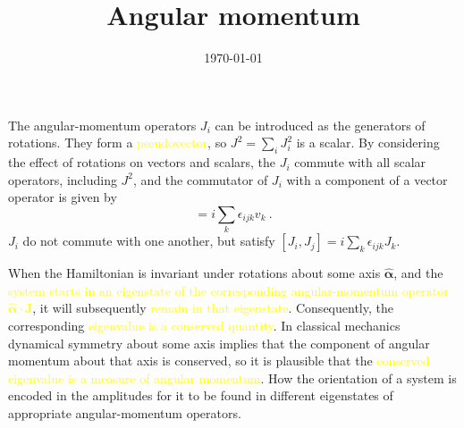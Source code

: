 \documentclass[12pt,a4paper]{article}
\title{Angular momentum}
\author{}
\date{\today}
\renewcommand{\vec}[1]{\boldsymbol{#1}}
\begin{document}
\maketitle

\cite{binney2013physics} The angular-momentum operators $J_i$ can be introduced as the generators of rotations. They form a \textcolor{yellow}{pseudovector}, so $J^2 = \sum_i J_i^2$ is a scalar. By considering the effect of rotations on vectors and scalars, the $J_i$ commute with all scalar operators, including $J^2$, and the commutator of $J_i$ with a component of a vector operator is given by 
\begin{equation}
[J_i, v_j] = i \sum_k \epsilon_{ijk} v_k ~.
\end{equation}
$J_i$ do not commute with one another, but satisfy $[J_i, J_j] = i \sum_k \epsilon_{ijk} J_k$.

When the Hamiltonian is invariant under rotations about some axis $\vec{\hat{\alpha}}$, and the \textcolor{yellow}{system starts in an eigenstate of the corresponding angular-momentum operator $\vec{\hat{\alpha}} \cdot \vec{J}$}, it will subsequently \textcolor{yellow}{remain in that eigenstate}. Consequently, the corresponding \textcolor{yellow}{eigenvalue is a conserved quantity}. In classical mechanics dynamical symmetry about some axis implies that the component of angular momentum about that axis is conserved, so it is plausible that the \textcolor{yellow}{conserved eigenvalue is a measure of angular momentum}. How the orientation of a system is encoded in the amplitudes for it to be found in different eigenstates of appropriate angular-momentum operators.
\end{document}
